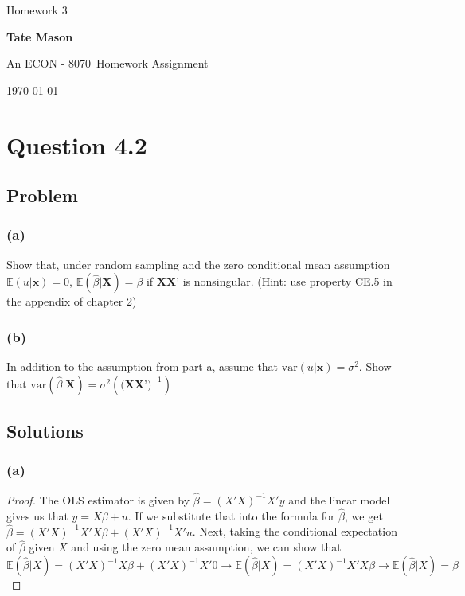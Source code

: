 \documentclass[10pt, a4paper]{article}
\newcommand\course{ECON - 8070}                            %
\newcommand\hwnumber{ 3}                                 %
\newcommand\Information{Tate Mason}                        %
\newcommand{\EE}{\mathbb E}
\newcommand{\var}{\text{var}}
\begin{document}
  \begin{titlepage}
    \begin{center}
      \vspace*{3cm}
            
        \vspace{1cm}
        \huge
        Homework \hwnumber
            
        \vspace{1.5cm}
        \Large
            
        \textbf{\Information}                      %
            
        \vfill
        
        An \course \ Homework Assignment
            
        \vspace{1cm}
        \Large
        
        \today
            
    \end{center}
  \end{titlepage}

  \newpage
  \section*{Question 4.2}
    \subsection*{Problem}
      \subsubsection*{(a)}
        Show that, under random sampling and the zero conditional mean assumption $\EE(u|\textbf{x})=0$, $\EE(\hat{\beta}|\textbf{X})=\beta$ if $\textbf{XX'}$ is nonsingular. (Hint: use property CE.5 in the appendix of chapter 2)
      \subsubsection*{(b)}
        In addition to the assumption from part a, assume that $\var(u|\textbf{x}) = \sigma^2$. Show that $\var(\hat{\beta}|\textbf{X}) = \sigma^2(\textbf{(XX')}^{-1})$
    \subsection*{Solutions}
      \subsubsection*{(a)}
        \begin{proof}
          The OLS estimator is given by $\hat{\beta} = (X'X)^{-1}X'y$ and the linear model gives us that $y = X\beta + u$. If we substitute that into the formula for $\hat{\beta}$, we get $\hat{\beta} = (X'X)^{-1}X'X\beta + (X'X)^{-1}X'u$. Next, taking the conditional expectation of $\hat{\beta}$ given $X$ and using the zero mean assumption, we can show that $\EE(\hat{\beta}|X) = (X'X)^{-1}X\beta + (X'X)^{-1}X'0 \rightarrow \EE(\hat{\beta}|X) = (X'X)^{-1}X'X\beta \rightarrow \EE({\hat{\beta}|X}) = \beta$ 
        \end{proof}
\end{document}
